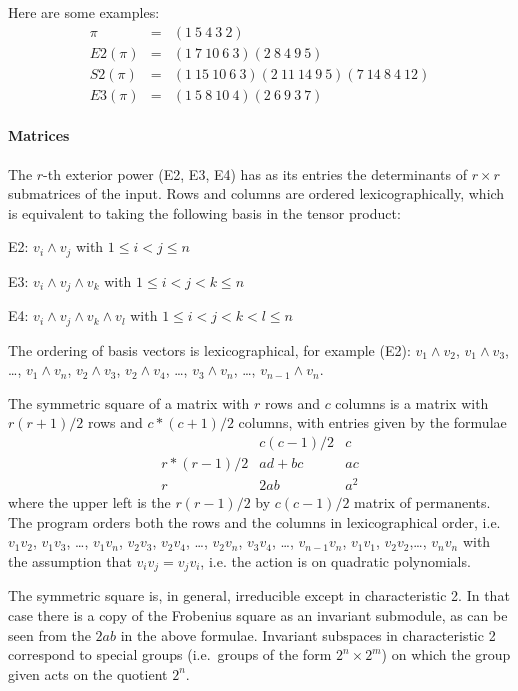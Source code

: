Here are some examples:
\begin{eqnarray*}
	\pi & = & (1\ 5\ 4\ 3\ 2) \\
	E2(\pi) & = & (1\ 7\ 10\ 6\ 3)(2\ 8\ 4\ 9\ 5) \\
	S2(\pi) & = & (1\ 15\ 10\ 6\ 3)(2\ 11\ 14\ 9\ 5)
		(7\ 14\ 8\ 4\ 12) \\
	E3(\pi) & = & (1\ 5\ 8\ 10\ 4)(2\ 6\ 9\ 3\ 7)
\end{eqnarray*}


\paragraph{Matrices}
The $r$-th exterior
power (E2, E3, E4) has as its entries the determinants of
$r\times r$ submatrices of the input. Rows and columns are ordered
lexicographically, which is equivalent to taking the following
basis in the tensor product:
\begin{list}{}{ \leftmargin 7mm \parsep 0mm
\itemsep 0mm}
\item[E2:\hfill]
	$v_i\wedge v_j$ with $1\leq i<j\leq n$
\item[E3:\hfill]
	$v_i\wedge v_j\wedge v_k$ with $1\leq i<j<k\leq n$
\item[E4:\hfill]
	$v_i\wedge v_j\wedge v_k\wedge v_l$ with $1\leq i<j<k<l\leq n$
\end{list}
The ordering of basis vectors is lexicographical, for example (E2):
$v_1\wedge v_2$, $v_1\wedge v_3$, \ldots, $v_1\wedge v_n$,
$v_2\wedge v_3$, $v_2\wedge v_4$, \ldots, $v_3\wedge v_n$,
\ldots, $v_{n-1}\wedge v_n$.

The symmetric square of a matrix with $r$ rows and $c$ columns is a
matrix with $r(r+1)/2$ rows and $c*(c+1)/2$ columns, with entries
given by the formulae
\[
\begin{array}{c|cc}
	  &  c(c-1)/2  & c  \\ \hline
r*(r-1)/2 & ad+bc      & ac \\
	r &  2ab       & a^2
\end{array}
\]
where the upper left is the $r(r-1)/2$ by $c(c-1)/2$ matrix of
permanents. The program orders both the rows and the columns in
lexicographical order, i.e.
$v_1v_2$, $v_1v_3$, \ldots, $v_1v_n$, $v_2v_3$, $v_2v_4$, \ldots,
$v_2v_n$, $v_3v_4$, \ldots, $v_{n-1}v_n$, $v_1v_1$, $v_2v_2$,\ldots,
$v_nv_n$
with the assumption that $v_iv_j = v_jv_i$, i.e. the action is on
quadratic polynomials.

The symmetric square is, in general, irreducible except in
characteristic 2. In that case there is a copy of the Frobenius square
as an invariant submodule, as can be seen from the $2ab$ in the above
formulae. Invariant subspaces in characteristic 2 correspond to special
groups (i.e.\ groups of the form $2^n\times 2^m$) on which the group
given acts on the quotient $2^n$.

